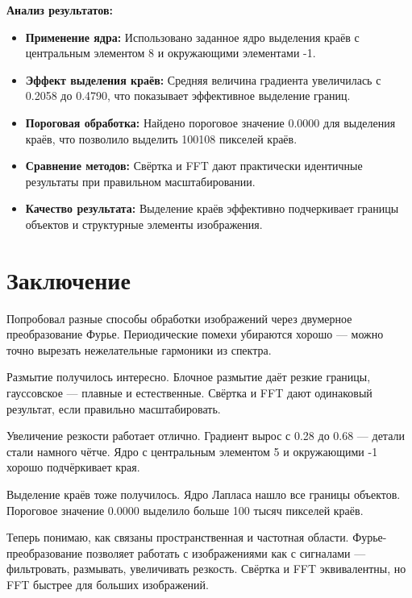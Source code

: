 \textbf{Анализ результатов:}
\begin{itemize}
    \item \textbf{Применение ядра:} Использовано заданное ядро выделения краёв с центральным элементом 8 и окружающими элементами -1.
    
    \item \textbf{Эффект выделения краёв:} Средняя величина градиента увеличилась с 0.2058 до 0.4790, что показывает эффективное выделение границ.
    
    \item \textbf{Пороговая обработка:} Найдено пороговое значение 0.0000 для выделения краёв, что позволило выделить 100108 пикселей краёв.
    
    \item \textbf{Сравнение методов:} Свёртка и FFT дают практически идентичные результаты при правильном масштабировании.
    
    \item \textbf{Качество результата:} Выделение краёв эффективно подчеркивает границы объектов и структурные элементы изображения.
\end{itemize}

\section*{Заключение}

Попробовал разные способы обработки изображений через двумерное преобразование Фурье. Периодические помехи убираются хорошо — можно точно вырезать нежелательные гармоники из спектра.

Размытие получилось интересно. Блочное размытие даёт резкие границы, гауссовское — плавные и естественные. Свёртка и FFT дают одинаковый результат, если правильно масштабировать.

Увеличение резкости работает отлично. Градиент вырос с 0.28 до 0.68 — детали стали намного чётче. Ядро с центральным элементом 5 и окружающими -1 хорошо подчёркивает края.

Выделение краёв тоже получилось. Ядро Лапласа нашло все границы объектов. Пороговое значение 0.0000 выделило больше 100 тысяч пикселей краёв.

Теперь понимаю, как связаны пространственная и частотная области. Фурье-преобразование позволяет работать с изображениями как с сигналами — фильтровать, размывать, увеличивать резкость. Свёртка и FFT эквивалентны, но FFT быстрее для больших изображений.
